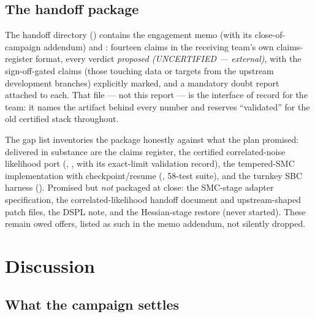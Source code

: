 \subsection{The handoff package}
\label{sec:gifts:handoff}

The handoff directory () contains the engagement
memo (with its close-of-campaign addendum) and : fourteen
claims in the receiving team's own claims-register format, every verdict
{\it proposed (UNCERTIFIED --- external)}, with the sign-off-gated claims
(those touching data or targets from the upstream development branches)
explicitly marked, and a mandatory doubt report attached to each. That file
--- not this report --- is the interface of record for the team: it names
the artifact behind every number and reserves ``validated'' for the old
certified stack throughout.

The gap list  inventories the
package honestly against what the plan promised: delivered in substance are the
claims register, the certified correlated-noise likelihood port
(, , with its exact-limit
validation record), the tempered-SMC implementation with
checkpoint/resume (, 58-test suite), and the turnkey
SBC harness (). Promised but {\it not} packaged at
close: the SMC-stage adapter specification, the correlated-likelihood
handoff document and upstream-shaped patch files, the DSPL note, and the
Hessian-stage restore (never started). These remain owed offers, listed as
such in the memo addendum, not silently dropped.

\section{Discussion}
\label{sec:discussion}

\subsection{What the campaign settles}

